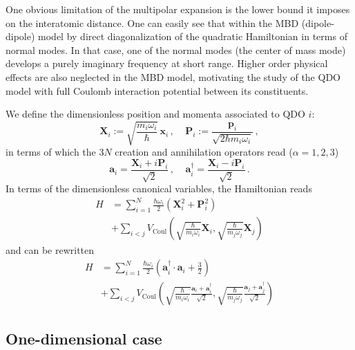 \documentclass[reprint, amsmath, amssymb, aps]{revtex4-2}
\begin{document}
        One obvious limitation of the multipolar expansion is the lower bound it imposes on the interatomic distance. One can easily see that within the MBD (dipole-dipole) model by direct diagonalization of the quadratic Hamiltonian in terms of normal modes. In that case, one of the normal modes (the center of mass mode) develops a purely imaginary frequency at short range. Higher order physical effects are also neglected in the MBD model, motivating the study of the QDO model with full Coulomb interaction potential between its constituents.

        We define the dimensionless position and momenta associated to QDO $i$:
        \begin{equation}
            \bm{X}_i := \sqrt{\frac{m_i\omega_i}{\hbar}}\,\bm{x}_i\,,\ \ \ \ \ \bm{P}_i := \frac{\bm{p}_i}{\sqrt{2\hbar m_i\omega_i}}\,,
        \end{equation}
        in terms of which the $3N$ creation and annihilation operators read ($\alpha=1,2,3$)
        \begin{equation}
            \bm a_{i} = \frac{\bm X_{i} + i\bm P_{i}}{\sqrt 2}\,,\ \ \ \ \ \bm a^\dagger_{i} = \frac{\bm X_{i} - i\bm P_{i}}{\sqrt 2}\,.
        \end{equation}
        In terms of the dimensionless canonical variables, the Hamiltonian reads
        \begin{equation}
        \begin{split}
            H &= \sum_{i=1}^N\frac{\hbar\omega_i}{2}\left(\bm X_{i}^2 + \bm P_{i}^2\right) \\
            & + \sum_{i<j}V_\text{Coul}\left(\sqrt{\frac{\hbar}{m_i\omega_i}}\bm{X} _i, \sqrt{\frac{\hbar}{m_j\omega_j}}\bm{X} _j\right)
        \end{split}
        \end{equation}
        and can be rewritten
        \begin{equation}
        \begin{split}
            H &= \sum_{i=1}^N\frac{\hbar\omega_i}{2}\left(\bm a_{i}^\dagger\cdot\bm a_{i} +\frac{3}{2}\right) \\
            & + \sum_{i<j}V_\text{Coul}\left(\sqrt{\frac{\hbar}{m_i\omega_i}}\frac{\bm a_i + \bm a_i^\dagger}{\sqrt 2}, \sqrt{\frac{\hbar}{m_j\omega_j}}\frac{\bm a_j + \bm a_j^\dagger}{\sqrt 2}\right)
        \end{split}
        \end{equation}
    \subsection{One-dimensional case}
\end{document}
